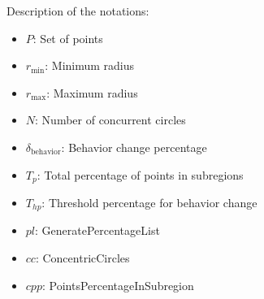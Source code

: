     Description of the notations:
    \begin{itemize}[noitemsep,topsep=0pt]
        \item $P$: Set of points
        \item $r_{\text{min}}$: Minimum radius
        \item $r_{\text{max}}$: Maximum radius
        \item $N$: Number of concurrent circles
        \item $\delta_{\text{behavior}}$: Behavior change percentage
        \item $T_p$: Total percentage of points in subregions
        \item $T_{hp}$: Threshold percentage for behavior change
        \item $pl$: GeneratePercentageList
        \item $cc$: ConcentricCircles
        \item $cpp$: PointsPercentageInSubregion
    \end{itemize}
    
    
    
    



